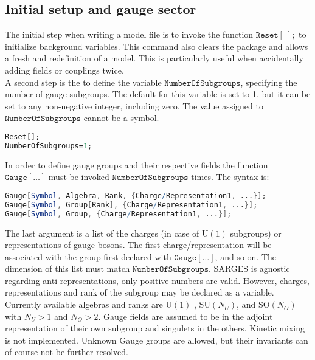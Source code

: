 \documentclass{scrartcl}
\begin{document}
\subsection{Initial setup and gauge sector}
The initial step when writing a model file is to invoke the function $\mathtt{Reset[\;];}$ to initialize background variables. This command also clears the package and allows a fresh and redefinition of a model. This is particularly useful when accidentally adding fields or couplings twice. \\
A second step is the to define the variable $\mathtt{NumberOfSubgroups}$, specifying the number of gauge subgroups. The default for this variable is set to 1, but it can be set to any non-negative integer, including zero. The value assigned to $\mathtt{NumberOfSubgroups}$ cannot be a symbol.
\vspace{1em}
\begin{lstlisting}[language=mathematica,mathescape,columns=flexible,backgroundcolor=\color{light-gray}]
Reset[];
NumberOfSubgroups=1;
\end{lstlisting}
\vspace{1em}
In order to define gauge groups and their respective fields the function $\mathtt{Gauge[\dots]}$ must be invoked $\mathtt{NumberOfSubgroups}$ times. The syntax is:
\begin{lstlisting}[language=mathematica,mathescape,columns=flexible,backgroundcolor=\color{light-gray}]
Gauge[Symbol, Algebra, Rank, {Charge/Representation1, ...}];
Gauge[Symbol, Group[Rank], {Charge/Representation1, ...}];
Gauge[Symbol, Group, {Charge/Representation1, ...}];
\end{lstlisting}
The last argument is a list of the charges (in case of $\mathrm{U}(1)$ subgroups) or representations of gauge bosons. The first charge/representation will be associated with the group first declared with $\mathtt{Gauge[\dots]}$, and so on. The dimension of this list must match $\mathtt{NumberOfSubgroups}$. SARGES is agnostic regarding anti-representations, only positive numbers are valid. However, charges, representations and rank of the subgroup may be declared as a variable. \newline Currently available algebras and ranks are $\mathrm{U}(1)$ , $\mathrm{SU}(N_U)$, and $\mathrm{SO}(N_O)$ with $N_U > 1$ and $N_O > 2$. Gauge fields are assumed to be in the adjoint representation of their own subgroup and singulets in the others. Kinetic mixing is not implemented. \newline Unknown Gauge groups are allowed, but their invariants can of course not be further resolved.
\FloatBarrier
\end{document}
